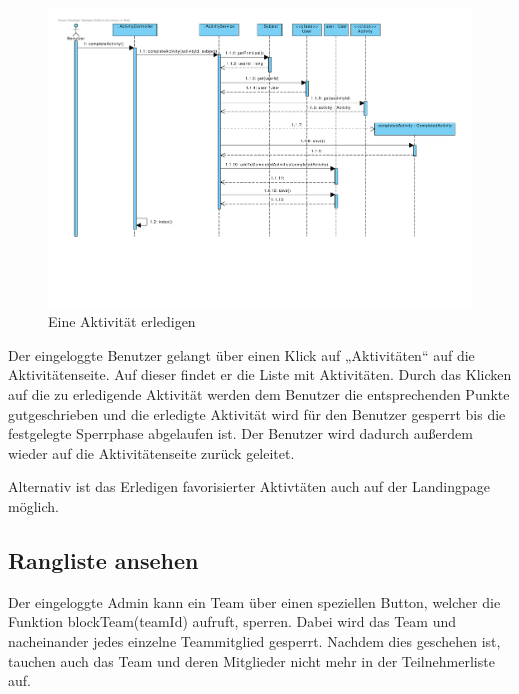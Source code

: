 \begin{figure}[H]
  \centering
  \includegraphics[width=\textwidth, clip]{gfx/aktivitaet_erledigen}
  \caption{Eine Aktivität erledigen}
\end{figure}

Der eingeloggte Benutzer gelangt über einen Klick auf „Aktivitäten“
auf die Aktivitätenseite. Auf dieser findet er die Liste mit
Aktivitäten. Durch das Klicken auf die zu erledigende Aktivität werden
dem Benutzer die entsprechenden Punkte gutgeschrieben und die
erledigte Aktivität wird für den Benutzer gesperrt bis die festgelegte
Sperrphase abgelaufen ist. Der Benutzer wird dadurch außerdem wieder auf die
Aktivitätenseite zurück geleitet.

Alternativ ist das Erledigen favorisierter Aktivtäten auch auf der
Landingpage möglich.

\subsection{Rangliste ansehen}


Der eingeloggte Admin kann ein Team über einen speziellen Button, welcher die Funktion blockTeam(teamId) aufruft, sperren. Dabei wird das Team und nacheinander jedes einzelne Teammitglied gesperrt. Nachdem dies geschehen ist, tauchen auch das Team und deren Mitglieder nicht mehr in der Teilnehmerliste auf.

